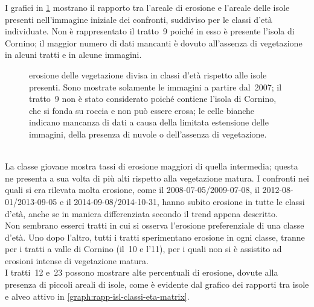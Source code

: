 I grafici in \cref{graph:erosione-classi-eta-matrix} mostrano il rapporto tra l'areale di erosione e l'areale delle isole presenti nell'immagine iniziale dei confronti, suddiviso per le classi d'età individuate.
Non è rappresentato il tratto~9 poiché in esso è presente l'isola di Cornino; il maggior numero di dati mancanti è dovuto all'assenza di vegetazione in alcuni tratti e in alcune immagini.
%
\begin{figure}
	\centering
	
	\caption[erosione delle vegetazione divisa in classi d'età rispetto alle isole presenti]{erosione delle vegetazione divisa in classi d'età rispetto alle isole presenti.
	Sono mostrate solamente le immagini a partire dal~2007; il tratto~9 non è stato considerato poiché contiene l'isola di Cornino, che si fonda su roccia e non può essere erosa; le celle bianche indicano mancanza di dati a causa della limitata estensione delle immagini, della presenza di nuvole o dell'assenza di vegetazione.}
	\label{graph:erosione-classi-eta-matrix}
\end{figure}
%
\\
La classe giovane mostra tassi di erosione maggiori di quella intermedia; questa ne presenta a sua volta di più alti rispetto alla vegetazione matura.
I confronti nei quali si era rilevata molta erosione, come il 2008-07-05/2009-07-08, il 2012-08-01/2013-09-05 e il 2014-09-08/2014-10-31, hanno subito erosione in tutte le classi d'età, anche se in maniera differenziata secondo il trend appena descritto.
\\
Non sembrano esserci tratti in cui si osserva l'erosione preferenziale di una classe d'età. Uno dopo l'altro, tutti i tratti sperimentano erosione in ogni classe, tranne per i tratti a valle di Cornino (il~10 e l'11), per i quali non si è assistito ad erosioni intense di vegetazione matura.
\\
I tratti~12 e~23 possono mostrare alte percentuali di erosione, dovute alla presenza di piccoli areali di isole, come è evidente dal grafico dei rapporti tra isole e alveo attivo in \cref{graph:rapp-isl-classi-eta-matrix}.

